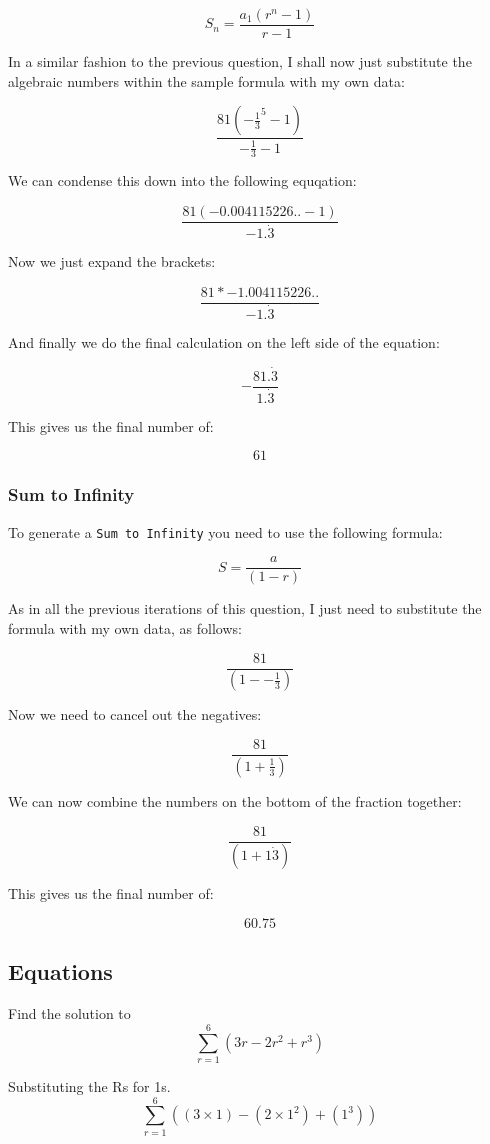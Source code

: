\documentclass[a4paper,12pt]{article}
\begin{document}
\[
  S_n = \frac{a_1(r^n-1)}{r-1}
\]

In a similar fashion to the previous question, I shall now just substitute the algebraic numbers within the sample formula with my own data:

\[
  \frac{81(-\frac{1}{3}^5-1)}{-\frac{1}{3}-1}
\]

We can condense this down into the following equqation:

\[
  \frac{81(-0.004115226..-1)}{-1.\dot{3}}
\]

Now we just expand the brackets:

\[
  \frac{81 * -1.004115226..}{-1.\dot{3}}
\]

And finally we do the final calculation on the left side of the equation:

\[
  -\frac{81.\dot{3}}{1.\dot{3}}
\]

This gives us the final number of:

\[
  61
\]

\newpage

\subsubsection{Sum to Infinity}
To generate a \texttt{Sum to Infinity} you need to use the following formula:

\[
  S = \frac{a}{(1-r)}
\]

As in all the previous iterations of this question, I just need to substitute the formula with my own data, as follows:

\[
  \frac{81}{(1--\frac{1}{3})}
\]

Now we need to cancel out the negatives:

\[
  \frac{81}{(1+\frac{1}{3})}
\]

We can now combine the numbers on the bottom of the fraction together:

\[
  \frac{81}{(1+1\dot{3})}
\]

This gives us the final number of:

\[
  60.75
\]

\newpage

\subsection{Equations}
Find the solution to
\[
  \sum_{r=1}^6 (3r - 2r^2 + r^3)
\]

Substituting the Rs for 1s.
\[
  \sum_{r=1}^6 ((3 \times 1) - (2 \times 1^2) + (1^3))
\]
\end{document}

